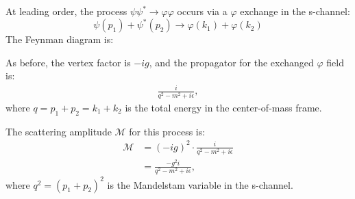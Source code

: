 \begin{enumerate}
At leading order, the process $\psi \psi^* \rightarrow \varphi \varphi$ occurs via a $\varphi$ exchange in the s-channel:
\[
\psi(p_1) + \psi^*(p_2) \rightarrow \varphi(k_1) + \varphi(k_2)
\]
The Feynman diagram is:
\begin{center}
\end{center}
As before, the vertex factor is $-ig$, and the propagator for the exchanged $\varphi$ field is:
\begin{align}
    \frac{i}{q^2 - m^2 + i\epsilon}, 
\end{align}
where $q = p_1 + p_2 = k_1 + k_2$ is the total energy in the center-of-mass frame.

The scattering amplitude $\mathcal{M}$ for this process is:
\begin{align}
    \mathcal{M} &= (-ig)^2 \cdot \frac{i}{q^2 - m^2 + i\epsilon} \nonumber \\
    &= \frac{-g^2 i}{q^2 - m^2 + i\epsilon},
\end{align}
where $q^2 = (p_1 + p_2)^2$ is the Mandelstam variable in the s-channel.
\end{enumerate}
\bigskip\bigskip\hline\hline\bigskip